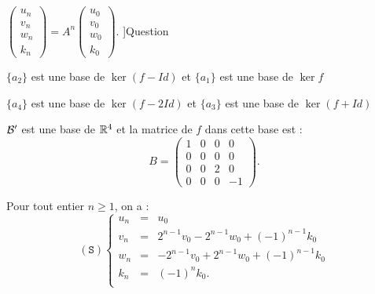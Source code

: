 \begin{multi}
{\(\left(\begin{array}{r}u_n\\v_n\\ w_n\\k_n\end{array}\right) = A^n \left(\begin{array}{r}u_0\\v_0\\ w_0\\k_0\end{array}\right)\).
}]{Question}
    \item \(\{a_2\}\) est une base de \(\ker (f-Id)\) et \(\{a_1\}\) est une base de \(\ker f\)
    \item \(\{a_4 \}\) est une base de \(\ker (f-2Id)\) et  \(\{a_3\}\) est une base de \(\ker (f+Id)\)
    \item* \({\cal B}'\) est une base de \(\mathbb{R}^4\) et la matrice de \(f\) dans cette base est :
\[B=\left(\begin{array}{rccc}1&0&0&0\\0&0&0&0\\
0&0&2&0\\0&0&0&-1\end{array}\right).\]
    \item* Pour tout entier \(n\ge 1\), on a : \[(\mathtt{S})
\left\{\begin{array}{rcc}
u_n&=&u_0\\
v_n&=&2^{n-1}v_0-2^{n-1}w_0+(-1)^{n-1}k_0\\
w_n&=&-2^{n-1}v_0+2^{n-1}w_0+(-1)^{n-1}k_0 \\
k_n&=&(-1)^nk_0.\\
\end{array}\right.\]
\end{multi}


